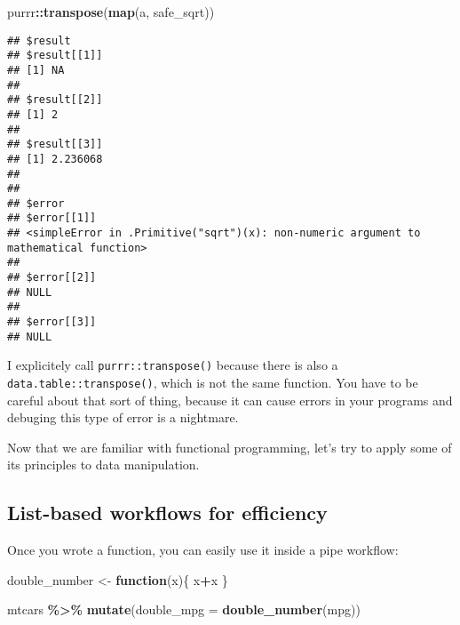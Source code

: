 \documentclass[
]{article}
\newenvironment{Shaded}{\begin{snugshade}}{\end{snugshade}}
\newcommand{\ControlFlowTok}[1]{\textcolor[rgb]{0.13,0.29,0.53}{\textbf{#1}}}
\newcommand{\DataTypeTok}[1]{\textcolor[rgb]{0.13,0.29,0.53}{#1}}
\newcommand{\KeywordTok}[1]{\textcolor[rgb]{0.13,0.29,0.53}{\textbf{#1}}}
\newcommand{\NormalTok}[1]{#1}
\newcommand{\OperatorTok}[1]{\textcolor[rgb]{0.81,0.36,0.00}{\textbf{#1}}}
\newcommand{\StringTok}[1]{\textcolor[rgb]{0.31,0.60,0.02}{#1}}
\begin{document}
\begin{Shaded}
\begin{Highlighting}[]
\NormalTok{purrr}\OperatorTok{::}\KeywordTok{transpose}\NormalTok{(}\KeywordTok{map}\NormalTok{(a, safe\_sqrt))}
\end{Highlighting}
\end{Shaded}

\begin{verbatim}
## $result
## $result[[1]]
## [1] NA
## 
## $result[[2]]
## [1] 2
## 
## $result[[3]]
## [1] 2.236068
## 
## 
## $error
## $error[[1]]
## <simpleError in .Primitive("sqrt")(x): non-numeric argument to mathematical function>
## 
## $error[[2]]
## NULL
## 
## $error[[3]]
## NULL
\end{verbatim}

I explicitely call \texttt{purrr::transpose()} because there is also a \texttt{data.table::transpose()}, which
is not the same function. You have to be careful about that sort of thing, because it can cause
errors in your programs and debuging this type of error is a nightmare.

Now that we are familiar with functional programming, let's try to apply some of its principles
to data manipulation.

\hypertarget{list-based-workflows-for-efficiency}{%
\subsection{List-based workflows for efficiency}\label{list-based-workflows-for-efficiency}}

Once you wrote a function, you can easily use it inside a pipe workflow:

\begin{Shaded}
\begin{Highlighting}[]
\NormalTok{double\_number \textless{}{-}}\StringTok{ }\ControlFlowTok{function}\NormalTok{(x)\{}
\NormalTok{  x}\OperatorTok{+}\NormalTok{x}
\NormalTok{\}}
\end{Highlighting}
\end{Shaded}

\begin{Shaded}
\begin{Highlighting}[]
\NormalTok{mtcars }\OperatorTok{\%\textgreater{}\%}
\StringTok{  }\KeywordTok{mutate}\NormalTok{(}\DataTypeTok{double\_mpg =} \KeywordTok{double\_number}\NormalTok{(mpg))}
\end{Highlighting}
\end{Shaded}
\end{document}
